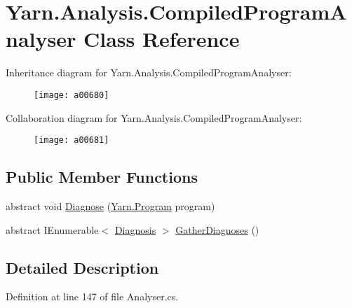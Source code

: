 \hypertarget{a00052}{\section{Yarn.\-Analysis.\-Compiled\-Program\-Analyser Class Reference}
\label{a00052}
}


Inheritance diagram for Yarn.\-Analysis.\-Compiled\-Program\-Analyser\-:
\nopagebreak
\begin{figure}[H]
\begin{center}
\leavevmode
\texttt{[image: a00680]}
\end{center}
\end{figure}


Collaboration diagram for Yarn.\-Analysis.\-Compiled\-Program\-Analyser\-:
\nopagebreak
\begin{figure}[H]
\begin{center}
\leavevmode
\texttt{[image: a00681]}
\end{center}
\end{figure}
\subsection*{Public Member Functions}
\begin{DoxyCompactItemize}
\item 
abstract void \hyperlink{a00052_aba4a36cb823b11ee491074e26477d084}{Diagnose} (\hyperlink{a00140}{Yarn.\-Program} program)
\item 
abstract I\-Enumerable$<$ \hyperlink{a00089}{Diagnosis} $>$ \hyperlink{a00052_afe059a2ceeabe50380b000420e512bd6}{Gather\-Diagnoses} ()
\end{DoxyCompactItemize}


\subsection{Detailed Description}


Definition at line 147 of file Analyser.\-cs.



